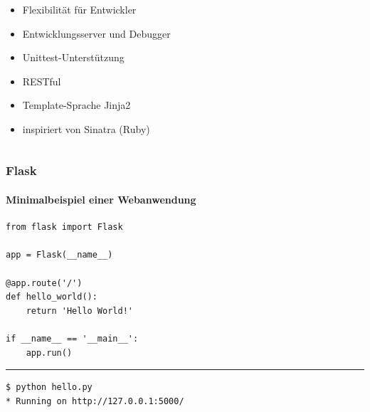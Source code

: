 \documentclass[
    t,
    smaller,
    compress,
    xcolor=svgnames,            %
    table,
]{beamer}
\begin{document}
\begin{frame}
\begin{columns}
\begin{column}{.7\textwidth}
            \begin{itemize}[<1->]
                    \item Flexibilität für Entwickler%
                    \item Entwicklungsserver und Debugger
                    \item Unittest-Unterstützung
                    \item RESTful
                    \item Template-Sprache Jinja2
                    \item inspiriert von Sinatra (Ruby)
            \end{itemize}

            \end{column}

        \end{columns}
\end{frame}


\begin{frame}[fragile]
  \frametitle{Flask}
  \framesubtitle{Minimalbeispiel einer Webanwendung}

  \vspace{-12pt}
  \begin{lstlisting}[title=hello.py]
from flask import Flask

app = Flask(__name__)

@app.route('/')
def hello_world():
    return 'Hello World!'

if __name__ == '__main__':
    app.run()
  \end{lstlisting}
  \hrule
  \begin{lstlisting}
$ python hello.py
* Running on http://127.0.0.1:5000/
  \end{lstlisting}%
\end{frame}
\end{document}
